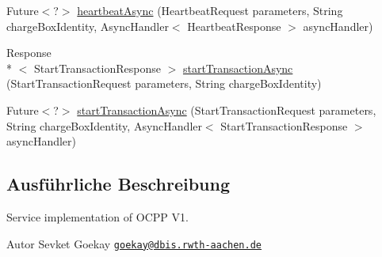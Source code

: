 \begin{DoxyCompactItemize}
\item 
Future$<$?$>$ \hyperlink{classde_1_1rwth_1_1idsg_1_1steve_1_1ocpp_1_1soap_1_1_central_system_service12___soap_server_a086f65ee11764ca7121cfe4788eb272e}{heartbeat\-Async} (Heartbeat\-Request parameters, String charge\-Box\-Identity, Async\-Handler$<$ Heartbeat\-Response $>$ async\-Handler)
\item 
Response\\*
$<$ Start\-Transaction\-Response $>$ \hyperlink{classde_1_1rwth_1_1idsg_1_1steve_1_1ocpp_1_1soap_1_1_central_system_service12___soap_server_a87b19e1909995e8814c53dd6d57e7183}{start\-Transaction\-Async} (Start\-Transaction\-Request parameters, String charge\-Box\-Identity)
\item 
Future$<$?$>$ \hyperlink{classde_1_1rwth_1_1idsg_1_1steve_1_1ocpp_1_1soap_1_1_central_system_service12___soap_server_a4e29c666020ebd620183f014ed48a3f8}{start\-Transaction\-Async} (Start\-Transaction\-Request parameters, String charge\-Box\-Identity, Async\-Handler$<$ Start\-Transaction\-Response $>$ async\-Handler)
\end{DoxyCompactItemize}


\subsection{Ausführliche Beschreibung}
Service implementation of O\-C\-P\-P V1.

\begin{DoxyAuthor}{Autor}
Sevket Goekay \href{mailto:goekay@dbis.rwth-aachen.de}{\tt goekay@dbis.\-rwth-\/aachen.\-de} 
\end{DoxyAuthor}


